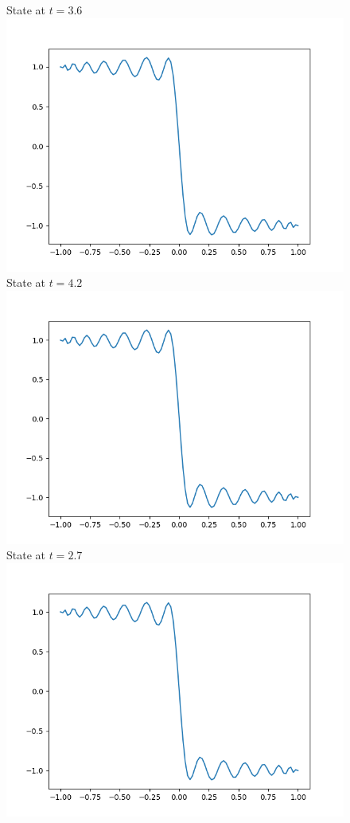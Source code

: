 \documentclass[a4paper,8pt]{article}
\begin{document}
\begin{figure}[h!]
\begin{multicols}{2}
State at $t=3.6$
\includegraphics[width=1\linewidth]{t4.2_plot.png}\\
State at $t=4.2$
\includegraphics[width=1\linewidth]{t2.7_plot.png}\\
State at $t=2.7$
\includegraphics[width=1\linewidth]{t3.3_plot.png}\\

\end{multicols}
\end{figure}
\end{document}
